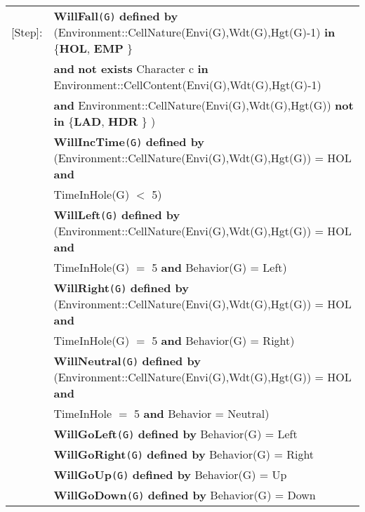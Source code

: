 \documentclass{article}
\begin{document}
\begin{tabular}{rl}
\textrm{[Step]}:
& \textbf{WillFall}\texttt{(G)} \textbf{defined by} (\textrm{Environment::CellNature(Envi(G),Wdt(G),Hgt(G)-1)} \textbf{in} \{\textbf{HOL}, \textbf{EMP} \}  \\
& \quad\quad \textbf{and} \textbf{not exists} \textrm{Character} c \textbf{in} \textrm{Environment::CellContent(Envi(G),Wdt(G),Hgt(G)-1)} \\
& \quad\quad \textbf{and} \textrm{Environment::CellNature(Envi(G),Wdt(G),Hgt(G))} \textbf{not in} \{\textbf{LAD}, \textbf{HDR} \} ) \\

& \textbf{WillIncTime}\texttt{(G)} \textbf{defined by} 
(\textrm{Environment::CellNature(Envi(G),Wdt(G),Hgt(G))} = \textrm{HOL} \textbf{and} \\
& \quad\quad \textrm{TimeInHole(G) $<$ 5)}
\\

& \textbf{WillLeft}\texttt{(G)} \textbf{defined by} 
(\textrm{Environment::CellNature(Envi(G),Wdt(G),Hgt(G))} = \textrm{HOL} \textbf{and} \\
& \quad\quad \textrm{TimeInHole(G)  $=$ 5} \textbf{and} \textrm{Behavior(G) = Left}) \\

& \textbf{WillRight}\texttt{(G)} \textbf{defined by} 
(\textrm{Environment::CellNature(Envi(G),Wdt(G),Hgt(G))} = \textrm{HOL} \textbf{and} \\
& \quad\quad \textrm{TimeInHole(G)  $=$ 5} \textbf{and} \textrm{Behavior(G)  = Right}) \\

& \textbf{WillNeutral}\texttt{(G)} \textbf{defined by} 
(\textrm{Environment::CellNature(Envi(G),Wdt(G),Hgt(G))} = \textrm{HOL} \textbf{and} \\
& \quad\quad \textrm{TimeInHole $=$ 5} \textbf{and} \textrm{Behavior = Neutral}) \\

& \textbf{WillGoLeft}\texttt{(G)} \textbf{defined by}  \textrm{Behavior(G)  = Left}\\

& \textbf{WillGoRight}\texttt{(G)} \textbf{defined by}  \textrm{Behavior(G)  = Right} \\

& \textbf{WillGoUp}\texttt{(G)} \textbf{defined by}  \textrm{Behavior(G)  = Up} \\

& \textbf{WillGoDown}\texttt{(G)} \textbf{defined by}  \textrm{Behavior(G)  = Down} \\


\end{tabular}
\end{document}
